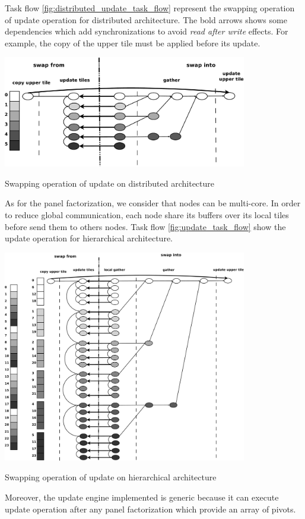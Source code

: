 Task flow \ref{fig:distributed_update_task_flow} represent the swapping operation of update operation for distributed architecture. The bold arrows shows some dependencies which add synchronizations to avoid \emph{read after write} effects. For example, the copy of the upper tile must be applied before its update.

\begin{taskflow}[!ht]
\centering
\includegraphics[width=0.8\textwidth]{figures/distributed_update_tf_bw.pdf}
\caption{Swapping operation of update on distributed architecture \label{fig:distributed_update_task_flow}}
\end{taskflow}

As for the panel factorization, we consider that nodes can be multi-core. In order to reduce global communication, each node share its buffers over its local tiles before send them to others nodes. Task flow \ref{fig:update_task_flow} show the update operation for hierarchical architecture.

\begin{taskflow}[!ht]
\centering
\includegraphics[width=0.8\textwidth]{figures/update_tf_bw.pdf}
\caption{Swapping operation of update on hierarchical architecture \label{fig:update_task_flow}}
\end{taskflow}

Moreover, the update engine implemented is generic because it can execute update operation after any panel factorization which provide an array of pivots.
